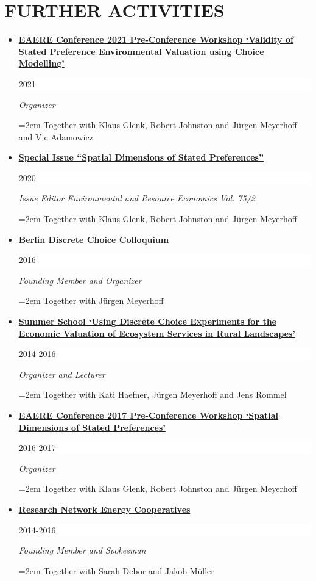 \documentclass[paper=a4,fontsize=11pt]{scrartcl} %
\newcommand{\NewPart}[2]{\section*{\uppercase{#1} #2}}
\newcommand{\EducationEntry}[4]{
		\noindent \textbf{#1} \hfill      %
		\colorbox{White}{%
			\parbox{6em}{%
			\hfill\color{Black}#2}} \par  %
		\noindent \textit{#3} \par        %
		\noindent\hangindent=2em\hangafter=0 \small #4 %
		\normalsize \par}
\begin{document}
\NewPart{Further Activities}{}
\begin{itemize}



\item \EducationEntry{\href{http://www.eaere-conferences.org/index.php?y=2020&p=226}{EAERE Conference 2021 Pre-Conference Workshop `Validity of Stated Preference Environmental Valuation using Choice Modelling'}}{2021}{Organizer}{Together with Klaus Glenk, Robert Johnston and Jürgen Meyerhoff and Vic Adamowicz}

\item 
\EducationEntry{\href{https://link.springer.com/journal/10640/75/2}{Special Issue ``Spatial Dimensions of Stated Preferences''}}{2020}{Issue Editor Environmental and Resource Economics Vol. 75/2}{Together with Klaus Glenk, Robert Johnston and Jürgen Meyerhoff}


\item 
\EducationEntry{\href{http://www.landschaftsoekonomie.tu-berlin.de/menue/berlin_dce_colloquium/}{Berlin Discrete Choice Colloquium}}{2016-\textcolor{white}{0000}}{Founding Member and Organizer}{Together with Jürgen Meyerhoff}

\item \EducationEntry{\href{http://communications.ext.zalf.de/sites/dce/SitePages/DCE\%20Summer\%20School.aspx}{Summer School `Using Discrete Choice Experiments for the Economic Valuation of Ecosystem Services in Rural Landscapes'}}{2014-2016}{Organizer and Lecturer}{Together with Kati Haefner, Jürgen Meyerhoff and Jens Rommel}

\item \EducationEntry{\href{http://www.eaere-conferences.org/index.php?p=60}{EAERE Conference 2017 Pre-Conference Workshop `Spatial Dimensions of Stated Preferences'}}{2016-2017}{Organizer}{Together with Klaus Glenk, Robert Johnston and Jürgen Meyerhoff}

\item \EducationEntry{\href{http://forschungsnetzwerk-energiegenossenschaften.de}{Research Network Energy Cooperatives}}{2014-2016}{Founding Member and Spokesman}{Together with Sarah Debor and Jakob Müller}

\end{itemize}
\end{document}
